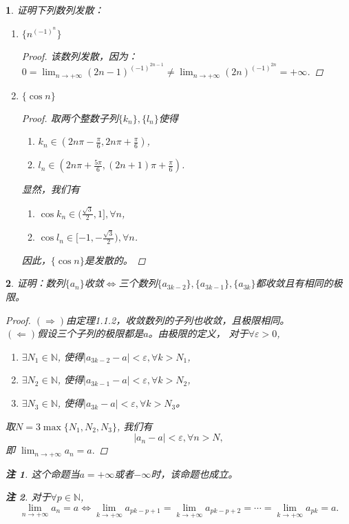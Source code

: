\documentclass[utf8]{book}
\newtheorem{example}{}[section]             %
\newtheorem{remark}{注}
\begin{document}
\begin{example}
证明下列数列发散：
\renewcommand\labelenumi{\normalfont(\theenumi)}
\begin{enumerate}
\item $\{n^{(-1)^n}\}$
\begin{proof}
该数列发散，因为：
$0 = \displaystyle \lim_{n\to +\infty}(2n-1)^{(-1)^{2n-1}} \neq \displaystyle \lim_{n\to +\infty}(2n)^{(-1)^{2n}} = +\infty$.
\end{proof}
\item $\{\cos n\}$
\begin{proof}
取两个整数子列$\{k_n\}, \{l_n\}$使得
\renewcommand\labelenumi{\normalfont(\theenumi)}
\begin{enumerate}
\item $k_n \in (2n\pi - \frac{\pi}{6},2n\pi + \frac{\pi}{6})$,
\item $l_n \in (2n\pi + \frac{5\pi}{6}, (2n+1)\pi + \frac{\pi}{6})$.
\end{enumerate}
显然，我们有
\renewcommand\labelenumi{\normalfont(\theenumi)}
\begin{enumerate}
\item $\cos k_n \in (\frac{\sqrt 3}{2}, 1], \forall n$,
\item $\cos l_n \in [-1, -\frac{\sqrt 3}{2}), \forall n$.
\end{enumerate}
因此，$\{\cos n\}$是发散的。
\end{proof}
\end{enumerate}
\end{example}
\begin{example}
证明：数列$\{a_n\}$收敛$\Leftrightarrow$三个数列$\{a_{3k-2}\}, \{a_{3k-1}\}, \{a_{3k}\}$都收敛且有相同的极限。
\begin{proof}
$(\Rightarrow)$由定理1.1.2，收敛数列的子列也收敛，且极限相同。\\
$(\Leftarrow)$假设三个子列的极限都是$a$。由极限的定义， 对于$\forall \varepsilon > 0$, 
\begin{enumerate}
\renewcommand\labelenumi{\normalfont(\theenumi)}
\item $\exists N_{1} \in \mathbb{N}$, 使得$\left |a_{3k-2} - a\right | < \varepsilon, \forall k > N_{1}$,
\item $\exists N_{2} \in \mathbb{N}$, 使得$\left |a_{3k-1} - a\right | < \varepsilon, \forall k > N_{2}$,
\item $\exists N_{3} \in \mathbb{N}$, 使得$\left |a_{3k} - a\right | < \varepsilon, \forall k > N_{3}$。
\end{enumerate}
取$N = 3\max\{N_1,N_2,N_3\}$, 我们有$$\left | a_n - a \right | < \varepsilon, \forall n > N,$$
即 $\displaystyle \lim_{n\to +\infty}a_n = a.$
\end{proof}
\begin{remark}
这个命题当$a = +\infty$或者$-\infty$时，该命题也成立。
\end{remark}
\begin{remark}
对于$\forall p \in \mathbb{N}$, $$\displaystyle \lim_{n\to +\infty}a_n = a \Leftrightarrow \lim_{k\to +\infty}a_{pk-p+1} = \lim_{k\to +\infty}a_{pk-p+2} 
=\cdots = \lim_{k\to +\infty}a_{pk} = a.$$
\end{remark}
\end{example}
\end{document}
